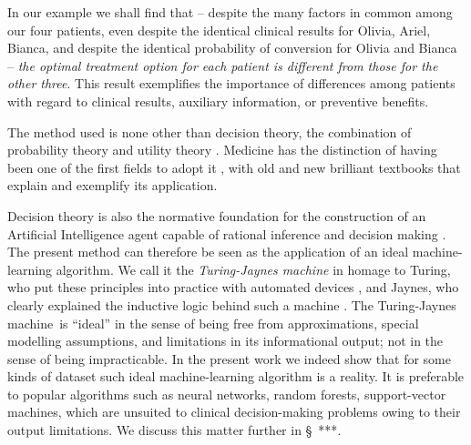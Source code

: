 \documentclass[utf8]{FrontiersinHarvard} %
\newcommand*{\wrench}{{\fontencoding{U}\fontfamily{fontawesomethree}\selectfont\symbol{114}}}
\newcommand{\mynotew}[1]{{\color{notecolour}\wrench\ #1}}
\newcommand*{\sect}{\S}%
\newcommand*{\chap}{ch.}%
\newcommand*{\chaps}{chs}%
\renewcommand*{\|}[1][]{\nonscript\:#1\vert\nonscript\:\mathopen{}}
\newcommand*{\tjm}{Turing-Jaynes machine}
\begin{document}
In our example we shall find that -- despite the many factors in common among our four patients, even despite the identical clinical results for Olivia, Ariel, Bianca, and despite the identical probability of conversion for Olivia and Bianca -- \emph{the optimal treatment option for each patient is different from those for the other three}. This result exemplifies the importance of differences among patients with regard to clinical results, auxiliary information, or preventive benefits.

The method used is none other than decision theory, the combination of probability theory and utility theory \citep[\chaps~13--14]{vonneumannetal1944_r1955,raiffaetal1961_r2000,raiffa1968_r1970,lindley1971_r1988,kreps1988,jaynes1994_r2003}. Medicine has the distinction of having been one of the first fields to adopt it \citep{ledleyetal1959}, with old and new brilliant textbooks \citep{weinsteinetal1980,soxetal1988_r2013,huninketal2001_r2014} that explain and exemplify its application.

Decision theory is also the normative foundation for the construction of an Artificial Intelligence agent capable of rational inference and decision making \citetext{\citealp[\chap~IV]{russelletal1995_r2022}; \citealp[\chaps~1--2]{jaynes1994_r2003}}. The present method can therefore be seen as the application of an ideal machine-learning algorithm. We call it the \emph{Turing-Jaynes machine}  in homage to Turing, who put these principles into practice with automated devices \citep{good1979}, and Jaynes, who clearly explained the inductive logic behind such a machine \citep{jaynes1994_r2003}. The \tjm\ is \enquote{ideal} in the sense of being free from approximations, special modelling assumptions, and limitations in its informational output; not in the sense of being impracticable. In the present work we indeed show that for some kinds of dataset such ideal machine-learning algorithm is a reality. It is preferable to popular algorithms such as neural networks, random forests, support-vector machines, which are unsuited to clinical decision-making problems owing to their output limitations. We discuss this matter further in \sect\mynotew{***}.

%
%
\end{document}
